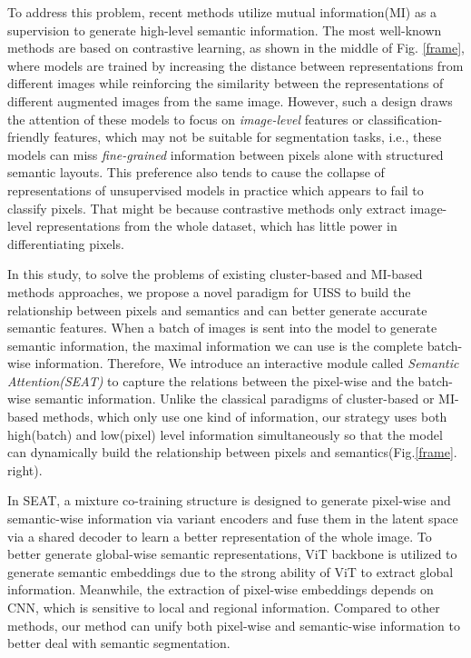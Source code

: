 \documentclass[letterpaper]{article} \usepackage{aaai23}  \usepackage{times}  \usepackage{helvet}  \usepackage{courier}  \usepackage[hyphens]{url}  \usepackage{graphicx} \urlstyle{rm} \def\UrlFont{\rm}  \usepackage{natbib}  \usepackage{caption} \frenchspacing  \setlength{\pdfpagewidth}{8.5in}  \setlength{\pdfpageheight}{11in}  \usepackage{algorithm}
\begin{document}
To address this problem, recent methods\cite{hjelm2018learning}\cite{cho2021picie}\cite{ji2019invariant} utilize mutual information(MI) as a supervision to generate high-level semantic information. The most well-known methods are based on contrastive learning, as shown in the middle of Fig. \ref{frame}, where models are trained by increasing the distance between representations from different images while reinforcing the similarity between the representations of different augmented images from the same image. However, such a design draws the attention of these models to focus on \textit{image-level} features or classification-friendly features, which may not be suitable for segmentation tasks, i.e., these models can miss \textit{fine-grained} information between pixels alone with structured semantic layouts. This preference also tends to cause the collapse of representations of unsupervised models in practice which appears to fail to classify pixels. That might be because contrastive methods only extract image-level representations from the whole dataset, which has little power in differentiating pixels.

In this study, to solve the problems of existing cluster-based and MI-based methods approaches, we propose a novel paradigm for UISS to build the relationship between pixels and semantics and can better generate accurate semantic features. 
When a batch of images is sent into the model to generate semantic information, the maximal information we can use is the complete batch-wise information. Therefore, We introduce an interactive module called \textit{Semantic Attention(SEAT)} to capture the relations between the pixel-wise and the batch-wise semantic information. Unlike the classical paradigms of cluster-based or MI-based methods, which only use one kind of information, our strategy uses both high(batch) and low(pixel) level information simultaneously so that the model can dynamically build the relationship between pixels and semantics(Fig.\ref{frame}. right). 

In SEAT, a mixture co-training structure is designed to generate pixel-wise and semantic-wise information via variant encoders and fuse them in the latent space via a shared decoder to learn a better representation of the whole image. To better generate global-wise semantic representations, ViT backbone is utilized to generate semantic embeddings due to the strong ability of ViT to extract global information. Meanwhile, the extraction of pixel-wise embeddings depends on CNN, which is sensitive to local and regional information. Compared to other methods, our method can unify both pixel-wise and semantic-wise information to better deal with semantic segmentation. 
\end{document}
